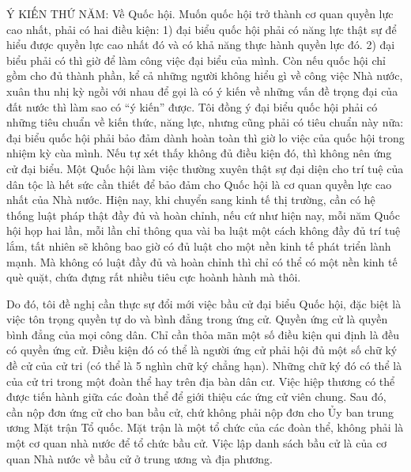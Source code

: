 Ý KIẾN THỨ NĂM: Về Quốc hội. Muốn quốc hội trở thành cơ quan quyền lực cao nhất, phải có hai điều kiện: 1) đại biểu quốc hội phải có năng lực thật sự để hiểu được quyền lực cao nhất đó và có khả năng thực hành quyền lực đó. 2) đại biểu phải có thì giờ để làm công việc đại biểu của mình. Còn nếu quốc hội chỉ gồm cho đủ thành phần, kể cả những người không hiểu gì về công việc Nhà nước, xuân thu nhị kỳ ngồi với nhau để gọi là có ý kiến về những vấn đề trọng đại của đất nước thì làm sao có “ý kiến” được. Tôi đồng ý đại biểu quốc hội phải có những tiêu chuẩn về kiến thức, năng lực, nhưng cũng phải có tiêu chuẩn này nữa: đại biểu quốc hội phải bảo đảm dành hoàn toàn thì giờ lo việc của quốc hội trong nhiệm kỳ cùa mình. Nếu tự xét thấy không đủ điều kiện đó, thì không nên ứng cử đại biểu. Một Quốc hội làm việc thường xuyên thật sự đại diện cho trí tuệ của dân tộc là hết sức cần thiết để bảo đảm cho Quốc hội là cơ quan quyền lực cao nhất của Nhà nước. Hiện nay, khi chuyển sang kinh tế thị trường, cần có hệ thống luật pháp thật đầy đủ và hoàn chỉnh, nếu cứ như hiện nay, mỗi năm Quốc hội họp hai lần, mỗi lần chỉ thông qua vài ba luật một cách không đầy đủ trí tuệ lắm, tất nhiên sẽ không bao giờ có đủ luật cho một nền kinh tế phát triển lành mạnh. Mà không có luật đầy đủ và hoàn chỉnh thì chỉ có thể có một nền kinh tế què quặt, chứa đựng rất nhiều tiêu cực hoành hành mà thôi.

Do đó, tôi đề nghị cần thực sự đổi mới việc bầu cử đại biểu Quốc hội, đặc biệt là việc tôn trọng quyền tự do và bình đẳng trong ứng cử. Quyền ứng cử là quyền bình đẳng của mọi công dân. Chỉ cần thỏa mãn một số điều kiện qui định là đều có quyền ứng cử. Điều kiện đó có thể là người ứng cử phải hội đủ một số chữ ký đề cử của cử tri (có thể là 5 nghìn chữ ký chẳng hạn). Những chữ ký đó có thể là của cử tri trong một đoàn thể hay trên địa bàn dân cư. Việc hiệp thương có thể được tiến hành giữa các đoàn thể để giới thiệu các ứng cử viên chung. Sau đó, cần nộp đơn ứng cử cho ban bầu cử, chứ không phải nộp đơn cho Ủy ban trung ương Mặt trận Tổ quốc. Mặt trận là một tổ chức của các đoàn thể, không phải là một cơ quan nhà nước để tổ chức bầu cử. Việc lập danh sách bầu cử là của cơ quan Nhà nước về bầu cử ở trung ương và địa phương.

